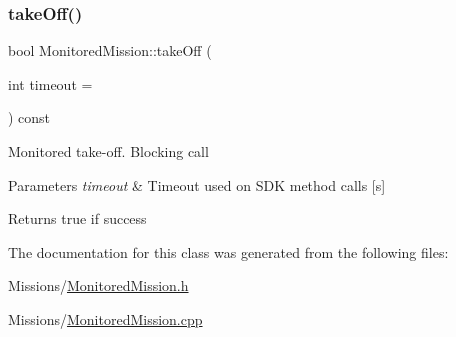 \subsubsection{\texorpdfstring{take\+Off()}{takeOff()}}
{\footnotesize\ttfamily bool Monitored\+Mission\+::take\+Off (\begin{DoxyParamCaption}\item[{int}]{timeout = {} }\end{DoxyParamCaption}) const}

Monitored take-\/off. Blocking call 
\begin{DoxyParams}{Parameters}
{\em timeout} & Timeout used on S\+DK method calls \mbox{[}s\mbox{]} \\
\hline
\end{DoxyParams}
\begin{DoxyReturn}{Returns}
true if success 
\end{DoxyReturn}


The documentation for this class was generated from the following files\+:\begin{DoxyCompactItemize}
\item 
Missions/\mbox{\hyperlink{_monitored_mission_8h}{Monitored\+Mission.\+h}}\item 
Missions/\mbox{\hyperlink{_monitored_mission_8cpp}{Monitored\+Mission.\+cpp}}\end{DoxyCompactItemize}

